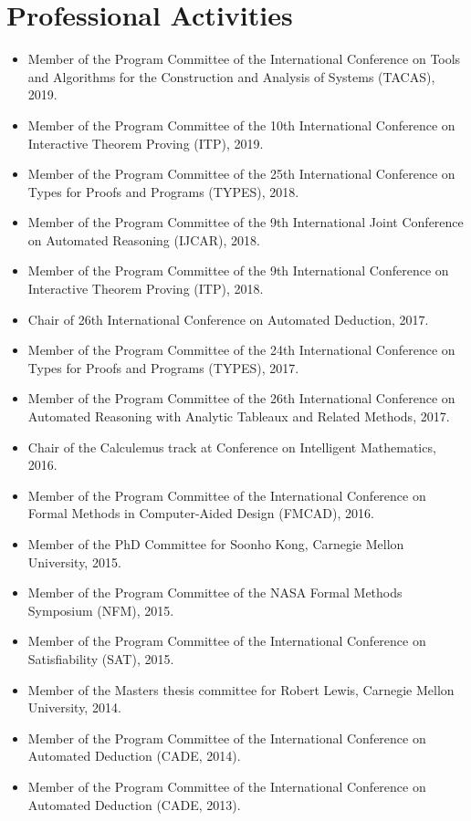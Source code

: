 \documentclass{article}
\begin{document}
\section*{Professional Activities}
\begin{itemize}
\item Member of the Program Committee of the International Conference on Tools and Algorithms for the Construction and Analysis of Systems (TACAS), 2019.
\item Member of the Program Committee of the 10th International Conference on Interactive Theorem Proving (ITP), 2019.
\item Member of the Program Committee of the 25th International Conference on Types for Proofs and Programs (TYPES), 2018.
\item Member of the Program Committee of the 9th International Joint Conference on Automated Reasoning (IJCAR), 2018.
\item Member of the Program Committee of the 9th International Conference on Interactive Theorem Proving (ITP), 2018.
\item Chair of 26th International Conference on Automated Deduction, 2017.
\item Member of the Program Committee of the 24th International Conference on Types for Proofs and Programs (TYPES), 2017.
\item Member of the Program Committee of the 26th International Conference on Automated Reasoning with Analytic Tableaux and Related Methods, 2017.
\item Chair of the Calculemus track at Conference on Intelligent Mathematics, 2016.
\item Member of the Program Committee of the International Conference on Formal Methods in Computer-Aided Design (FMCAD), 2016.
\item Member of the PhD Committee for Soonho Kong, Carnegie Mellon University, 2015.
\item Member of the Program Committee of the NASA Formal Methods Symposium (NFM), 2015.
\item Member of the Program Committee of the International Conference on Satisfiability (SAT), 2015.
\item Member of the Masters thesis committee for Robert Lewis, Carnegie Mellon University, 2014.
\item Member of the Program Committee of the International Conference on Automated Deduction (CADE, 2014).
\item Member of the Program Committee of the International Conference on Automated Deduction (CADE, 2013).

\end{itemize}
\end{document}
